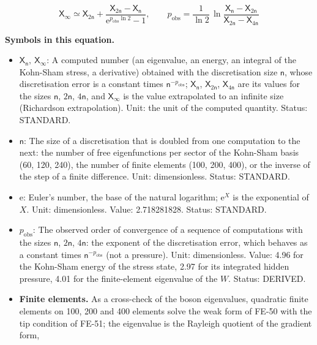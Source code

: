 \documentclass[
  10pt,
]{article}
\providecommand{\tightlist}{%
  \setlength{\itemsep}{0pt}\setlength{\parskip}{0pt}}
\begin{document}
\[
\mathsf{X}_\infty \simeq \mathsf{X}_{2\mathsf{n}} + \frac{\mathsf{X}_{2\mathsf{n}} - \mathsf{X}_{\mathsf{n}}}{\mathrm{e}^{p_{\mathrm{obs}}\ln2} - 1},
\qquad p_{\mathrm{obs}} = \frac{1}{\ln2}\,\ln\frac{\mathsf{X}_{\mathsf{n}} - \mathsf{X}_{2\mathsf{n}}}{\mathsf{X}_{2\mathsf{n}} - \mathsf{X}_{4\mathsf{n}}}
\]

\textbf{Symbols in this equation.}

\begin{itemize}
\tightlist
\item
  \(\mathsf{X}_{\mathsf{n}},\ \mathsf{X}_\infty\): A computed number (an
  eigenvalue, an energy, an integral of the Kohn-Sham stress, a
  derivative) obtained with the discretisation size \(\mathsf{n}\),
  whose discretisation error is a constant times
  \(\mathsf{n}^{-p_{\mathrm{obs}}}\); \(\mathsf{X}_{\mathsf{n}}\),
  \(\mathsf{X}_{2\mathsf{n}}\), \(\mathsf{X}_{4\mathsf{n}}\) are its
  values for the sizes \(\mathsf{n}\), \(2\mathsf{n}\), \(4\mathsf{n}\),
  and \(\mathsf{X}_\infty\) is the value extrapolated to an infinite
  size (Richardson extrapolation). Unit: the unit of the computed
  quantity. Status: STANDARD.
\item
  \(\mathsf{n}\): The size of a discretisation that is doubled from one
  computation to the next: the number of free eigenfunctions per sector
  of the Kohn-Sham basis (60, 120, 240), the number of finite elements
  (100, 200, 400), or the inverse of the step of a finite difference.
  Unit: dimensionless. Status: STANDARD.
\item
  \(\mathrm{e}\): Euler's number, the base of the natural logarithm;
  \(\mathrm{e}^{X}\) is the exponential of \(X\). Unit: dimensionless.
  Value: 2.718281828. Status: STANDARD.
\item
  \(p_{\mathrm{obs}}\): The observed order of convergence of a sequence
  of computations with the sizes \(\mathsf{n}\), \(2\mathsf{n}\),
  \(4\mathsf{n}\): the exponent of the discretisation error, which
  behaves as a constant times \(\mathsf{n}^{-p_{\mathrm{obs}}}\) (not a
  pressure). Unit: dimensionless. Value: 4.96 for the Kohn-Sham energy
  of the stress state, 2.97 for its integrated hidden pressure, 4.01 for
  the finite-element eigenvalue of the \(W\). Status: DERIVED.
\end{itemize}

\begin{itemize}
\tightlist
\item
  \textbf{Finite elements.} As a cross-check of the boson eigenvalues,
  quadratic finite elements on 100, 200 and 400 elements solve the weak
  form of FE-50 with the tip condition of FE-51; the eigenvalue is the
  Rayleigh quotient of the gradient form,
\end{itemize}
\end{document}

